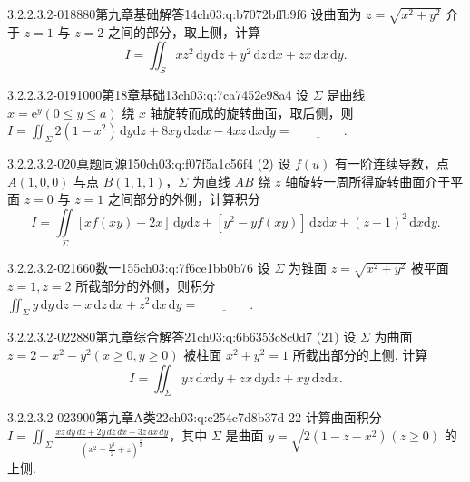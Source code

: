 \begin{q}{3.2.2.3.2-018}{880第九章基础解答14}{ch03:q:b7072bffb9f6}
设曲面为 $z=\sqrt{x^2+y^2}$ 介于 $z=1$ 与 $z=2$ 之间的部分，取上侧，计算
\[ I=\iint_S xz^2\,\mathrm{d}y\,\mathrm{d}z + y^2\,\mathrm{d}z\,\mathrm{d}x + zx\,\mathrm{d}x\,\mathrm{d}y. \]
\end{q}

\begin{q}{3.2.2.3.2-019}{1000第18章基础13}{ch03:q:7ca7452e98a4}
设 $\Sigma$ 是曲线 $x=\mathrm{e}^{y}(0\leqslant y\leqslant a)$ 绕 $x$ 轴旋转而成的旋转曲面，取后侧，则
$\displaystyle I=\iint_{\Sigma}2(1-x^2)\,\mathrm{d}y\mathrm{d}z+8xy\,\mathrm{d}z\mathrm{d}x-4xz\,\mathrm{d}x\mathrm{d}y=\underline{\hspace{4em}}.$
\end{q}

\begin{q}{3.2.2.3.2-020}{真题同源150}{ch03:q:f07f5a1c56f4}
(2) 设 $f(u)$ 有一阶连续导数，点 $A(1,0,0)$ 与点 $B(1,1,1)$，$\Sigma$ 为直线 $AB$ 绕 $z$ 轴旋转一周所得旋转曲面介于平面 $z=0$ 与 $z=1$ 之间部分的外侧，计算积分
\[ I=\iint\limits_{\Sigma}[xf(xy)-2x]\,\mathrm{d}y\mathrm{d}z+[y^2-yf(xy)]\,\mathrm{d}z\mathrm{d}x+(z+1)^2\,\mathrm{d}x\mathrm{d}y. \]
\end{q}

\begin{q}{3.2.2.3.2-021}{660数一155}{ch03:q:7f6ce1bb0b76}
设 $\Sigma$ 为锥面 $z=\sqrt{x^2+y^2}$ 被平面 $z=1,z=2$ 所截部分的外侧，则积分
$\displaystyle \iint_{\Sigma} y\,\mathrm{d}y\,\mathrm{d}z - x\,\mathrm{d}z\,\mathrm{d}x + z^2\,\mathrm{d}x\,\mathrm{d}y = \underline{\hspace{4em}}.$
\end{q}

\begin{q}{3.2.2.3.2-022}{880第九章综合解答21}{ch03:q:6b6353c8c0d7}
(21) 设 $\Sigma$ 为曲面 $z=2-x^2-y^2(x\geqslant 0,y\geqslant 0)$ 被柱面 $x^2+y^2=1$ 所截出部分的上侧, 计算
\[ I=\iint_{\Sigma} yz\,\mathrm{d}x\mathrm{d}y + zx\,\mathrm{d}y\mathrm{d}z + xy\,\mathrm{d}z\mathrm{d}x. \]
\end{q}

\begin{q}{3.2.2.3.2-023}{900第九章A类22}{ch03:q:c254c7d8b37d}
22 计算曲面积分 $\displaystyle I=\iint_{\Sigma} \frac{x z\,dy\,dz+2 y\,dz\,dx+3 z\,dx\,dy}{\left(x^{2}+\frac{y^{2}}{2}+z\right)^{\frac{1}{2}}}$，其中 $\Sigma$ 是曲面 $y=\sqrt{2(1-z-x^{2})}(z \ge 0)$ 的上侧.
\end{q}

